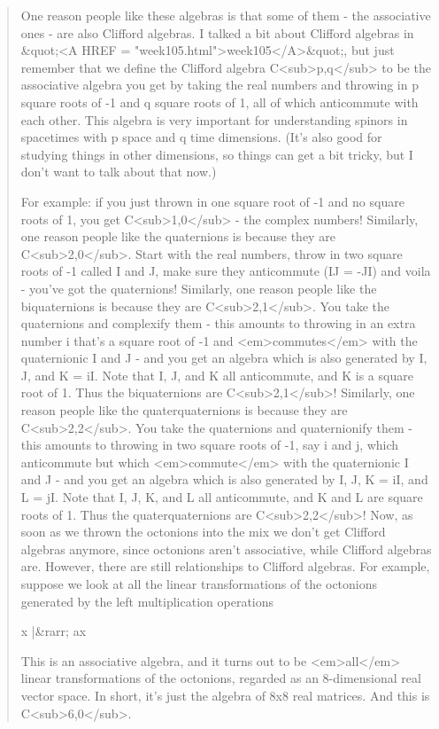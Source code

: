 \begin{quote}
One reason people like these algebras 
is that some of them - the associative ones - are also Clifford algebras.  
I talked a bit about Clifford algebras in 
&quot;<A HREF = "week105.html">week105</A>&quot;, but just remember that
we define the 
Clifford algebra C<sub>p,q</sub> to be the associative algebra you get 
by taking the real numbers and throwing in p square roots of -1 
and q square roots of 1, all of which anticommute with each other.  
This algebra is very important for understanding spinors in spacetimes 
with p space and q time dimensions.   (It's also good for studying 
things in other dimensions, so things can get a bit tricky, but I 
don't want to talk about that now.) 

For example: if you just thrown in one square root of -1 and no 
square roots of 1, you get C<sub>1,0</sub> - the complex numbers!
Similarly, one reason people like the quaternions is because
they are C<sub>2,0</sub>.  Start with the real numbers, throw in two
square roots of -1 called I and J, make sure they anticommute 
(IJ = -JI) and voila - you've got the quaternions!   
Similarly, one reason people like the biquaternions is because
they are C<sub>2,1</sub>.  You take the quaternions and complexify 
them - this amounts to throwing in an extra number i that's a square 
root of -1 and <em>commutes</em> with the quaternionic I and J - and you get
an algebra which is also generated by I, J, and K = iI.  Note
that I, J, and K all anticommute, and K is a square root of 1.  
Thus the biquaternions are C<sub>2,1</sub>!   
Similarly, one reason people like the quaterquaternions is because
they are C<sub>2,2</sub>.  You take the quaternions and quaternionify
them - this amounts to throwing in two square roots of -1, say i
and j, which anticommute but which <em>commute</em> with the quaternionic
I and J - and you get an algebra which is also generated by I, J,
K = iI, and L = jI.  Note that I, J, K, and L all anticommute, and
K and L are square roots of 1.  Thus the quaterquaternions are 
C<sub>2,2</sub>!
Now, as soon as we thrown the octonions into the mix we don't
get Clifford algebras anymore, since octonions aren't associative,
while Clifford algebras are.  However, there are still relationships
to Clifford algebras.  For example, suppose we look at all the linear
transformations of the octonions generated by the left multiplication
operations

x |&rarr; ax

This is an associative algebra, and it turns out to be <em>all</em>
linear transformations of the octonions, regarded as an 8-dimensional
real vector space.  In short, it's just the algebra of 8x8 real
matrices.  And this is C<sub>6,0</sub>.  


\end{quote}
